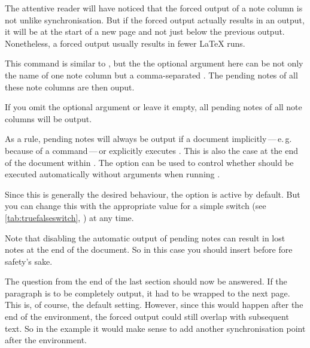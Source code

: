 The attentive reader will have
noticed that the forced output of a note column is not unlike synchronisation.
But if the forced output actually results in an output, it will be at the
start of a new page and not just below the previous output. Nonetheless, a
forced output usually results in fewer \LaTeX{} runs.%
\EndIndexGroup


\begin{Declaration}
\end{Declaration}
This command is similar to , but the
the optional argument here can be not only the name of one note column but a
comma-separated . The pending notes of all
these note columns are then ouput.

If you omit the optional argument or leave it empty, all pending notes of all
note columns will be output.%
\EndIndexGroup


\begin{Declaration}
\end{Declaration}
As a rule, pending notes will always be output if a document
implicitly\,---\,e.\,g. because of a 
command\,---\,or explicitly executes . This is
also the case at the end of the document within
. The  option can
be used to control whether  should be
executed automatically without arguments when running
.

Since this is generally the desired behaviour, the option is active by
default. But you can change this with the appropriate value for a simple
switch (see \autoref{tab:truefalseswitch}, )
at any time.

Note that disabling the automatic output of pending notes
can result in lost notes at the end of the document. So in this case you
should insert  before
 fore safety's sake.

The question from the end of the last section should now be answered. If the
paragraph is to be completely output, it had to be wrapped to the next page.
This is, of course, the default setting. However, since this would happen
after the end of the  environment, the forced
output could still overlap with subsequent text. So in the example it would
make sense to add another synchronisation point after the
 environment.

